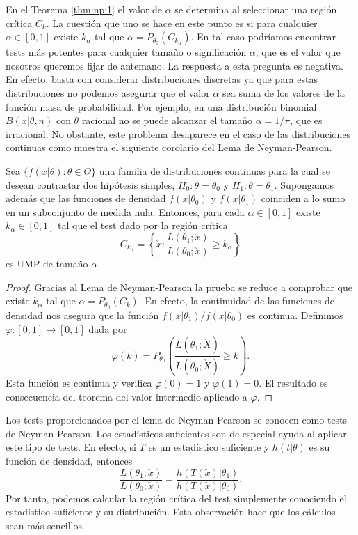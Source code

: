         En el Teorema \ref{thm:np:1} el valor de $\alpha$ se determina al seleccionar una región crítica $C_k$. La cuestión que uno se hace en este punto es si para cualquier $\alpha \in [0,1]$ existe $k_\alpha$ tal que  $\alpha = P_{\theta_0}(C_{k_\alpha})$. En tal caso podríamos encontrar tests más potentes para cualquier tamaño o significación $\alpha$, que es el valor que nosotros queremos fijar de antemano. La respuesta a esta pregunta es negativa. En efecto, basta con considerar distribuciones discretas ya que para estas distribuciones no podemos asegurar que el valor $\alpha$ sea suma de los valores de la función masa de probabilidad. Por ejemplo, en una distribución binomial $B(x|\theta,n)$ con $\theta$ racional no se puede alcanzar el tamaño $\alpha = 1 / \pi$, que es irracional. No obstante, este problema desaparece en el caso de las distribuciones continuas como muestra el siguiente corolario del Lema de Neyman-Pearson.

        \begin{cor} \label{cor:np:cont}
            Sea $\{f(x|\theta): \theta \in \Theta\}$ una familia de distribuciones continuas para la cual se desean contrastar dos hipótesis simples, $H_0 : \theta = \theta_0$ y $H_1 : \theta = \theta_1$. Supongamos además que las funciones de densidad $f(x|\theta_0)$ y $f(x|\theta_1)$ coinciden a lo sumo en un subconjunto de medida nula. Entonces, para cada $\alpha \in [0,1]$ existe $k_\alpha \in [0,1]$ tal que el test dado por la región crítica
            \[C_{k_\alpha} = \left\{\utilde{x}: \frac{L(\theta_1;\utilde{x})}{L(\theta_0;\utilde{x})} \ge k_\alpha\right\}\]
            es UMP de tamaño $\alpha$.
        \end{cor}
        \begin{proof}
            Gracias al Lema de Neyman-Pearson la prueba se reduce a comprobar que existe $k_\alpha$ tal que $\alpha = P_{\theta_0}(C_k)$. En efecto, la continuidad de las funciones de densidad nos asegura que la función $f(x| \theta_1) / f(x| \theta_0)$ es continua. Definimos $\varphi: [0,1] \to [0,1]$ dada por
            \[\varphi(k) = P_{\theta_0}(\frac{L(\theta_1;\utilde{X})}{L(\theta_0;\utilde{X})} \ge k).\]
            Esta función es continua y verifica $\varphi(0) = 1$ y $\varphi(1) = 0$. El resultado es consecuencia del teorema del valor intermedio aplicado a $\varphi$.
        \end{proof}

        Los tests proporcionados por el lema de Neyman-Pearson se conocen como tests de Neyman-Pearson. Los estadísticos suficientes son de especial ayuda al aplicar este tipo de tests. En efecto, si $T$ es un estadístico suficiente y $h(t | \theta)$ es su función de densidad, entonces
        \[\frac{L(\theta_1;\utilde{x})}{L(\theta_0;\utilde{x})} = \frac{h(T(\utilde{x}) | \theta_1)}{h(T(\utilde{x}) | \theta_0)}.\]
        Por tanto, podemos calcular la región crítica del test simplemente conociendo el estadístico suficiente y su distribución. Esta observación hace que los cálculos sean más sencillos.

